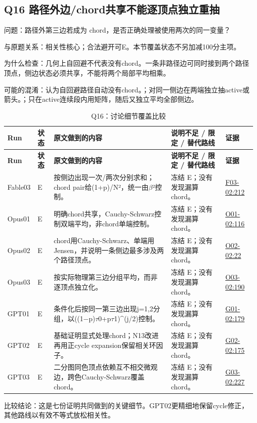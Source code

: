 \documentclass[11pt,a4paper]{article}
\begin{document}
\clearpage
\subsection{Q16 路径外边/chord共享不能逐顶点独立重抽}
\label{aspect:Q16}
问题：路径外第三边若成为 chord，是否正确处理被使用两次的同一变量？

与原题关系：相关性核心；合法避开可E。本节覆盖状态不另加减100分主项。

为什么检查：几何上自回避不代表没有chord。一条非路径边可同时接到两个路径顶点，侧边状态必须共享，不能将两个局部平均相乘。

可能的混淆：认为自回避路径自动没有chord。；对同一侧边在两端独立抽active或箭头。；只在active连续段内用矩阵，随后又独立平均全部侧边。

{\fontsize{9.0}{12.6}\selectfont
\setlength{\tabcolsep}{2.5pt}
\begin{longtable}{>{\raggedright\arraybackslash}p{}>{\raggedright\arraybackslash}p{}>{\raggedright\arraybackslash}p{}>{\raggedright\arraybackslash}p{}>{\raggedright\arraybackslash}p{}}
\caption{Q16：讨论细节覆盖比较}\\
\toprule
\textbf{Run} & \textbf{状态} & \textbf{原文做到的内容} & \textbf{说明不足 / 限定 / 替代路线} & \textbf{证据}\tabularnewline
\midrule
\endfirsthead
\toprule
\textbf{Run} & \textbf{状态} & \textbf{原文做到的内容} & \textbf{说明不足 / 限定 / 替代路线} & \textbf{证据}\tabularnewline
\midrule
\endhead
{}Fable03 & E & 按侧边出现一次/两次分别求和；chord pair给(1+p)/N²，统一由\ensuremath{\beta}²控制。 & 冻结 E；没有发现漏算chord。 & \hyperref[src:F03-02]{F03-02:212}\tabularnewline
{}Opus01 & E & 明确chord共享，Cauchy-Schwarz控制双端平均，非chord单端控制。 & 冻结 E；没有发现漏算chord。 & \hyperref[src:O01-02]{O01-02:116}\tabularnewline
{}Opus02 & E & chord用Cauchy-Schwarz、单端用Jensen，并说明一条侧边最多涉及两个路径顶点。 & 冻结 E；没有发现漏算chord。 & \hyperref[src:O02-02]{O02-02:22}\tabularnewline
{}Opus03 & E & 按实际物理第三边分组平均，而非逐顶点独立化。 & 冻结 E；没有发现漏算chord。 & \hyperref[src:O03-02]{O03-02:190}\tabularnewline
{}GPT01 & E & 条件化后按同一第三边出现j=1,2分组，以((1\ensuremath{-}p)\ensuremath{\tau}0+p\ensuremath{\tau}1)\textasciicircum{}(j/2)控制。 & 冻结 E；没有发现漏算chord。 & \hyperref[src:G01-02]{G01-02:179}\tabularnewline
{}GPT02 & E & 基础证明显式处理chord；N13改进再用正cycle expansion保留相关环因子。 & 冻结 E；没有发现漏算chord。 & \hyperref[src:G02-02]{G02-02:175}\tabularnewline
{}GPT03 & E & 二分图同色顶点依赖互不相交微观边，跨色Cauchy-Schwarz覆盖chord。 & 冻结 E；没有发现漏算chord。 & \hyperref[src:G03-02]{G03-02:227}\tabularnewline
\bottomrule
\end{longtable}
}
比较结论：这是七份证明共同做到的关键细节。GPT02更精细地保留cycle修正，其他路线以有效不等式放松相关性。
\end{document}
